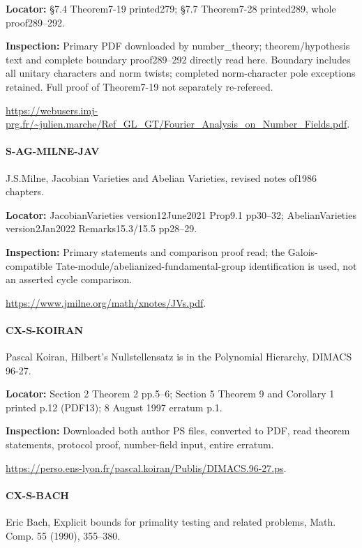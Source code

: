 \documentclass[11pt,a4paper]{article}
\begin{document}
\textbf{Locator:} §7.\allowbreak{}4 Theorem7-19 printed279; §7.\allowbreak{}7 Theorem7-28 printed289, whole proof289–\allowbreak{}292.

\textbf{Inspection:} Primary PDF downloaded by number\_\allowbreak{}theory; theorem/\allowbreak{}hypothesis text and complete boundary proof289–\allowbreak{}292 directly read here.\allowbreak{} Boundary includes all unitary characters and norm twists; completed norm-character pole exceptions retained.\allowbreak{} Full proof of Theorem7-19 not separately re-refereed.\allowbreak{}

\url{https://webusers.imj-prg.fr/~julien.marche/Ref_GL_GT/Fourier_Analysis_on_Number_Fields.pdf}.

\paragraph{S-AG-MILNE-JAV} J.\allowbreak{}S.\allowbreak{}Milne, Jacobian Varieties and Abelian Varieties, revised notes of1986 chapters.

\textbf{Locator:} JacobianVarieties version12June2021 Prop9.\allowbreak{}1 pp30–\allowbreak{}32; AbelianVarieties version2Jan2022 Remarks15.\allowbreak{}3/\allowbreak{}15.\allowbreak{}5 pp28–\allowbreak{}29.

\textbf{Inspection:} Primary statements and comparison proof read; the Galois-compatible Tate-module/\allowbreak{}abelianized-fundamental-group identification is used, not an asserted cycle comparison.\allowbreak{}

\url{https://www.jmilne.org/math/xnotes/JVs.pdf}.

\paragraph{CX-S-KOIRAN} Pascal Koiran, Hilbert’s Nullstellensatz is in the Polynomial Hierarchy, DIMACS 96-27.

\textbf{Locator:} Section 2 Theorem 2 pp.\allowbreak{}5–\allowbreak{}6; Section 5 Theorem 9 and Corollary 1 printed p.\allowbreak{}12 (PDF13); 8 August 1997 erratum p.\allowbreak{}1.

\textbf{Inspection:} Downloaded both author PS files, converted to PDF, read theorem statements, protocol proof, number-field input, entire erratum.\allowbreak{}

\url{https://perso.ens-lyon.fr/pascal.koiran/Publis/DIMACS.96-27.ps}.

\paragraph{CX-S-BACH} Eric Bach, Explicit bounds for primality testing and related problems, Math.\allowbreak{} Comp.\allowbreak{} 55 (1990), 355–\allowbreak{}380.
\end{document}
